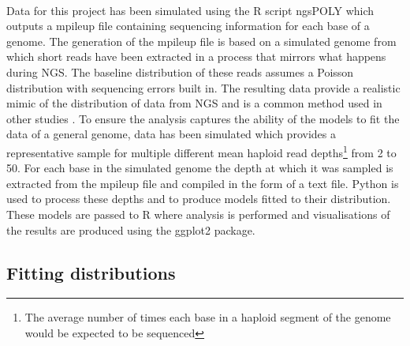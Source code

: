 \documentclass[11pt]{article}
\begin{document}
\paragraph{}Data for this project has been simulated using the R script ngsPOLY \autocite{Fumagalli2017} which outputs a mpileup file containing sequencing information for each base of a genome. The generation of the mpileup file is based on a simulated genome from which short reads have been extracted in a process that mirrors what happens during NGS. The baseline distribution of these reads assumes a Poisson distribution with sequencing errors built in. The resulting data provide a realistic mimic of the distribution of data from NGS and is a common method used in other studies \autocite{Kim2011}. To ensure the analysis captures the ability of the models to fit the data of a general genome, data has been simulated which provides a representative sample for multiple different mean haploid read depths\footnote{The average number of times each base in a haploid segment of the genome would be expected to be sequenced} from 2 to 50. For each base in the simulated genome the depth at which it was sampled is  extracted from the mpileup file and compiled in the form of a text file. Python is used to process these depths and to produce models fitted to their distribution. These models are passed to R where analysis is performed and visualisations of the results are produced using the ggplot2 package. 
\subsection{Fitting distributions}
\end{document}
